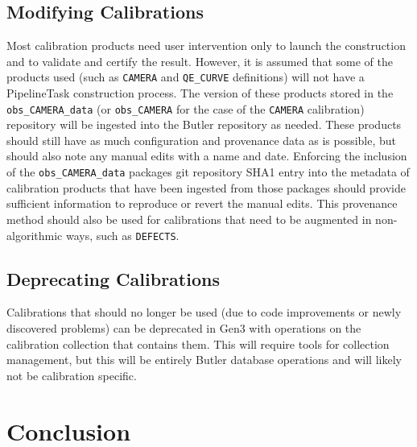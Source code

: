 \documentclass[DM,authoryear,toc]{lsstdoc}
\begin{document}
\subsection{Modifying Calibrations}

Most calibration products need user intervention only to launch the
construction and to validate and certify the result.  However, it is
assumed that some of the products used (such as \verb|CAMERA| and
\verb|QE_CURVE| definitions) will not have a PipelineTask construction
process.  The version of these products stored in the
\verb|obs_CAMERA_data| (or \verb|obs_CAMERA| for the case of the
\verb|CAMERA| calibration) repository will be ingested into the Butler
repository as needed.  These products should still have as much
configuration and provenance data as is possible, but should also note
any manual edits with a name and date.  Enforcing the inclusion of the
\verb|obs_CAMERA_data| packages git repository SHA1 entry into the
metadata of calibration products that have been ingested from those
packages should provide sufficient information to reproduce or revert
the manual edits.  This provenance method should also be used for
calibrations that need to be augmented in non-algorithmic ways, such
as \verb|DEFECTS|.

\subsection{Deprecating Calibrations}

Calibrations that should no longer be used (due to code improvements
or newly discovered problems) can be deprecated in Gen3 with
operations on the calibration collection that contains them.  This
will require tools for collection management, but this will be
entirely Butler database operations and will likely not be calibration
specific.

\section{Conclusion}



\appendix
\end{document}
